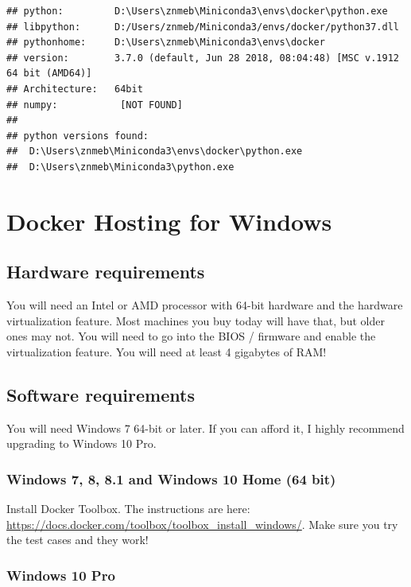 \documentclass[]{book}
\theoremstyle{definition}
\theoremstyle{definition}
\theoremstyle{definition}
\theoremstyle{remark}
\begin{document}
\begin{verbatim}
## python:         D:\Users\znmeb\Miniconda3\envs\docker\python.exe
## libpython:      D:/Users/znmeb/Miniconda3/envs/docker/python37.dll
## pythonhome:     D:\Users\znmeb\Miniconda3\envs\docker
## version:        3.7.0 (default, Jun 28 2018, 08:04:48) [MSC v.1912 64 bit (AMD64)]
## Architecture:   64bit
## numpy:           [NOT FOUND]
## 
## python versions found: 
##  D:\Users\znmeb\Miniconda3\envs\docker\python.exe
##  D:\Users\znmeb\Miniconda3\python.exe
\end{verbatim}

\hypertarget{docker-hosting-for-windows}{%
\chapter{Docker Hosting for Windows}\label{docker-hosting-for-windows}}

\hypertarget{hardware-requirements}{%
\section{Hardware requirements}\label{hardware-requirements}}

You will need an Intel or AMD processor with 64-bit hardware and the
hardware virtualization feature. Most machines you buy today will have
that, but older ones may not. You will need to go into the BIOS /
firmware and enable the virtualization feature. You will need at least 4
gigabytes of RAM!

\hypertarget{software-requirements}{%
\section{Software requirements}\label{software-requirements}}

You will need Windows 7 64-bit or later. If you can afford it, I highly
recommend upgrading to Windows 10 Pro.

\hypertarget{windows-7-8-8.1-and-windows-10-home-64-bit}{%
\subsection{Windows 7, 8, 8.1 and Windows 10 Home (64
bit)}\label{windows-7-8-8.1-and-windows-10-home-64-bit}}

Install Docker Toolbox. The instructions are here:
\url{https://docs.docker.com/toolbox/toolbox_install_windows/}. Make
sure you try the test cases and they work!

\hypertarget{windows-10-pro}{%
\subsection{Windows 10 Pro}\label{windows-10-pro}}
\end{document}
